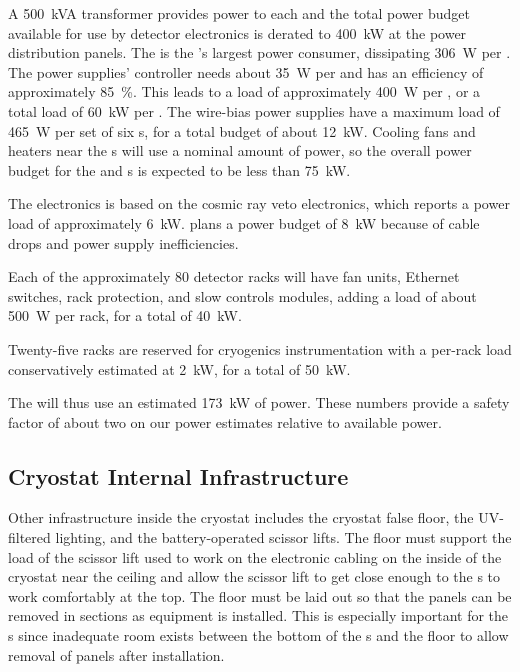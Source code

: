 A \SI{500}{kVA} transformer provides power to each  and the total power budget available for use by detector electronics is derated to \SI{400}{kW} at the power distribution panels.  
The  is the 's largest power consumer,  dissipating \SI{306}{W} per .  
The  power supplies' controller needs about \SI{35}{W} per  and has an efficiency of approximately \SI{85}{\%}. 
This leads to a load of  approximately  \SI{400}{W}  per , or a total load of  \SI{60}{kW} per .  
The  wire-bias power supplies have a maximum load of  \SI{465}{W} per set of six s, for a total budget of about   \SI{12}{kW}.   
Cooling fans and heaters near the \fdth{}s will use a nominal amount of power, so the overall power budget for the  and  s is expected to be less than \SI{75}{kW}.


The  electronics is based on the  cosmic ray veto electronics, which reports a power load of approximately  \SI{6}{kW}.   plans a power budget of  \SI{8}{kW} because of cable drops and  power supply inefficiencies.  

Each of the approximately 80 detector racks will have fan units, Ethernet switches, rack protection, and slow controls modules, adding a load of about \SI{500}{W} per rack, for a total of \SI{40}{kW}.

Twenty-five racks are reserved for cryogenics instrumentation with a per-rack load conservatively estimated at \SI{2}{kW}, for a total of \SI{50}{kW}. 

The  will thus use  an estimated \SI{173}{kW} of power.   These numbers provide a safety factor of about two on our power estimates relative to available power.


\subsection{Cryostat Internal Infrastructure}
\label{sec:fdsp-tc-infr-cryo-int}



Other infrastructure inside the cryostat includes the cryostat false floor, the UV-filtered lighting, and the battery-operated scissor lifts. 
The floor must support the load of the scissor lift used to work on the electronic cabling on the inside of the cryostat near the ceiling and allow the scissor lift to get close enough to the s to work comfortably at the top. 
The floor  must be laid out so that the panels can be removed in sections as equipment is installed. 
This is especially important for the s since inadequate room exists between the bottom of the s and the floor to allow removal of panels after installation. 


